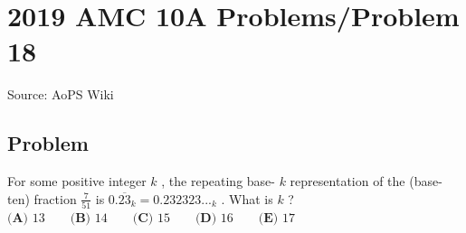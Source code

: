 \documentclass[12pt]{article}
\begin{document}
\section*{{2019 AMC 10A Problems/Problem 18}}
Source: AoPS Wiki

\subsection*{Problem}
For some positive integer $k$ , the repeating base- $k$ representation of the (base-ten) fraction $\frac{7}{51}$ is $0.\overline{23}_k = 0.232323..._k$ . What is $k$ ? $\textbf{(A) } 13 \qquad\textbf{(B) } 14 \qquad\textbf{(C) } 15 \qquad\textbf{(D) } 16 \qquad\textbf{(E) } 17$
\end{document}
